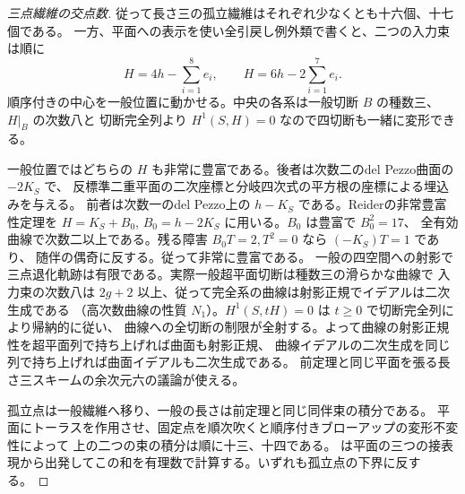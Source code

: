 \begin{proof}[三点繊維の交点数]
従って長さ三の孤立繊維はそれぞれ少なくとも十六個、十七個である。
一方、平面への表示を使い全引戻し例外類で書くと、二つの入力束は順に
\[
           H=4h-\sum_{i=1}^8 e_i,\qquad
           H=6h-2\sum_{i=1}^7 e_i .
\]
順序付きの中心を一般位置に動かせる。中央の各系は一般切断 $B$ の種数三、$H|_B$ の次数八と
切断完全列より $H^1(S,H)=0$ なので四切断も一緒に変形できる。

一般位置ではどちらの $H$ も非常に豊富である。後者は次数二のdel Pezzo曲面の $-2K_S$ で、
反標準二重平面の二次座標と分岐四次式の平方根の座標による埋込みを与える。
前者は次数一のdel Pezzo上の $h-K_S$ である。Reiderの非常豊富性定理を
$H=K_S+B_0$, $B_0=h-2K_S$ に用いる。$B_0$ は豊富で $B_0^2=17$、
全有効曲線で次数二以上である。残る障害 $B_0T=2,T^2=0$ なら $(-K_S)T=1$ であり、
随伴の偶奇に反する。従って非常に豊富である。
一般の四空間への射影で三点退化軌跡は有限である。実際一般超平面切断は種数三の滑らかな曲線で
入力束の次数八は $2g+2$ 以上、従って完全系の曲線は射影正規でイデアルは二次生成である
（高次数曲線の性質 $N_1$）。$H^1(S,tH)=0$ は $t\ge0$ で切断完全列により帰納的に従い、
曲線への全切断の制限が全射する。よって曲線の射影正規性を超平面列で持ち上げれば曲面も射影正規、
曲線イデアルの二次生成を同じ列で持ち上げれば曲面イデアルも二次生成である。
前定理と同じ平面を張る長さ三スキームの余次元六の議論が使える。

孤立点は一般繊維へ移り、一般の長さは前定理と同じ同伴束の積分である。
平面にトーラスを作用させ、固定点を順次吹くと順序付きブローアップの変形不変性によって
上の二つの束の積分は順に十三、十四である。
は平面の三つの接表現から出発してこの和を有理数で計算する。いずれも孤立点の下界に反する。
\end{proof}
